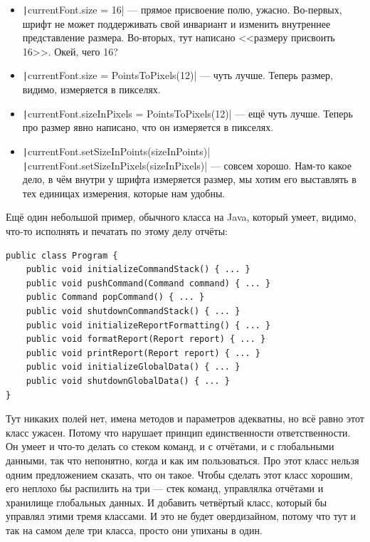 \documentclass{../text-style}
\begin{document}
\begin{itemize}
    \item \texttt|currentFont.size = 16| --- прямое присвоение полю, ужасно. Во-первых, шрифт не может поддерживать свой инвариант и изменить внутреннее представление размера. Во-вторых, тут написано <<размеру присвоить 16>>. Окей, чего 16?
    \item \texttt|currentFont.size = PointsToPixels(12)| --- чуть лучше. Теперь размер, видимо, измеряется в пикселях.
    \item \texttt|currentFont.sizeInPixels = PointsToPixels(12)| --- ещё чуть лучше. Теперь про размер явно написано, что он измеряется в пикселях.
    \item \texttt|currentFont.setSizeInPoints(sizeInPoints)| \newline
            \texttt|currentFont.setSizeInPixels(sizeInPixels)| --- совсем хорошо. Нам-то какое дело, в чём внутри у шрифта измеряется размер, мы хотим его выставлять в тех единицах измерения, которые нам удобны.
\end{itemize}

Ещё один небольшой пример, обычного класса на Java, который умеет, видимо, что-то исполнять и печатать по этому делу отчёты:

\begin{verbatim}
public class Program {
    public void initializeCommandStack() { ... }
    public void pushCommand(Command command) { ... }
    public Command popCommand() { ... }
    public void shutdownCommandStack() { ... }
    public void initializeReportFormatting() { ... }
    public void formatReport(Report report) { ... }
    public void printReport(Report report) { ... }
    public void initializeGlobalData() { ... }
    public void shutdownGlobalData() { ... }
}
\end{verbatim}

Тут никаких полей нет, имена методов и параметров адекватны, но всё равно этот класс ужасен. Потому что нарушает принцип единственности ответственности. Он умеет и что-то делать со стеком команд, и с отчётами, и с глобальными данными, так что непонятно, когда и как им пользоваться. Про этот класс нельзя одним предложением сказать, что он такое. Чтобы сделать этот класс хорошим, его неплохо бы распилить на три --- стек команд, управлялка отчётами и хранилище глобальных данных. И добавить четвёртый класс, который бы управлял этими тремя классами. И это не будет овердизайном, потому что тут и так на самом деле три класса, просто они упиханы в один.
\end{document}

